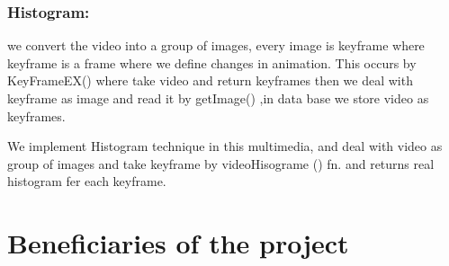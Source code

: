 \subsubsection{Histogram:}
we convert the video into a group of images, every image is keyframe where keyframe is a frame where we define
 changes in animation. This occurs by KeyFrameEX() where take video and return keyframes then we deal with 
 keyframe as image and read it by getImage() ,in data base we store video as keyframes. 

\vskip 0.2in
We implement Histogram technique in this multimedia, and deal with video as group of images and take keyframe by 
videoHisograme () fn. and returns real histogram fer each keyframe.




\section{Beneficiaries of the project}






